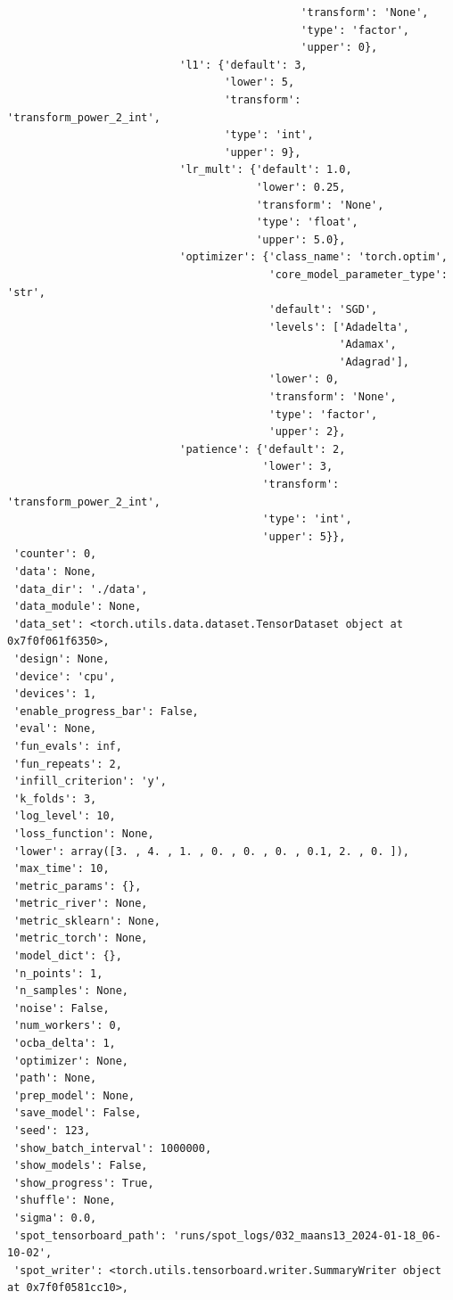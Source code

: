 \documentclass[
  letterpaper,
  DIV=11,
  numbers=noendperiod]{scrreprt}
\begin{document}
\begin{verbatim}
                                              'transform': 'None',
                                              'type': 'factor',
                                              'upper': 0},
                           'l1': {'default': 3,
                                  'lower': 5,
                                  'transform': 'transform_power_2_int',
                                  'type': 'int',
                                  'upper': 9},
                           'lr_mult': {'default': 1.0,
                                       'lower': 0.25,
                                       'transform': 'None',
                                       'type': 'float',
                                       'upper': 5.0},
                           'optimizer': {'class_name': 'torch.optim',
                                         'core_model_parameter_type': 'str',
                                         'default': 'SGD',
                                         'levels': ['Adadelta',
                                                    'Adamax',
                                                    'Adagrad'],
                                         'lower': 0,
                                         'transform': 'None',
                                         'type': 'factor',
                                         'upper': 2},
                           'patience': {'default': 2,
                                        'lower': 3,
                                        'transform': 'transform_power_2_int',
                                        'type': 'int',
                                        'upper': 5}},
 'counter': 0,
 'data': None,
 'data_dir': './data',
 'data_module': None,
 'data_set': <torch.utils.data.dataset.TensorDataset object at 0x7f0f061f6350>,
 'design': None,
 'device': 'cpu',
 'devices': 1,
 'enable_progress_bar': False,
 'eval': None,
 'fun_evals': inf,
 'fun_repeats': 2,
 'infill_criterion': 'y',
 'k_folds': 3,
 'log_level': 10,
 'loss_function': None,
 'lower': array([3. , 4. , 1. , 0. , 0. , 0. , 0.1, 2. , 0. ]),
 'max_time': 10,
 'metric_params': {},
 'metric_river': None,
 'metric_sklearn': None,
 'metric_torch': None,
 'model_dict': {},
 'n_points': 1,
 'n_samples': None,
 'noise': False,
 'num_workers': 0,
 'ocba_delta': 1,
 'optimizer': None,
 'path': None,
 'prep_model': None,
 'save_model': False,
 'seed': 123,
 'show_batch_interval': 1000000,
 'show_models': False,
 'show_progress': True,
 'shuffle': None,
 'sigma': 0.0,
 'spot_tensorboard_path': 'runs/spot_logs/032_maans13_2024-01-18_06-10-02',
 'spot_writer': <torch.utils.tensorboard.writer.SummaryWriter object at 0x7f0f0581cc10>,

\end{verbatim}
\end{document}
